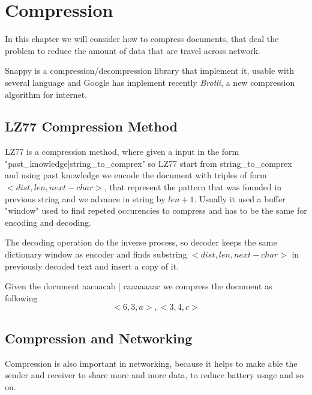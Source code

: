 \chapter{Compression}
In this chapter we will consider how to compress documents, that deal the problem to reduce 
the amount of data that are travel across network.

Snappy is a compression/decompression library that implement it, usable with several language and 
Google has implement recently \emph{Brotli}, a new compression algorithm for internet.

\section{LZ77 Compression Method}
LZ77 is a compression method, where given a input in the form "past\_knowledge|string\_to\_comprex"
so LZ77 start from string\_to\_comprex and using past knowledge we encode the document with triples
of form $<dist, len, next-char>$, that represent the pattern that was founded in previous string and
we advance in string by $len + 1$.\newline
Usually it used a buffer "window" used to find repeted occurencies to compress and has to be 
the same for encoding and decoding.

The decoding operation do the inverse process, so decoder keeps the same dictionary window as
encoder and finds substring $<dist, len, next-char>$ in previously decoded text and 
insert a copy of it.

\begin{esempio}
	Given the document aacaacab | caaaaaaac we compress the document as following
	\[ <6, 3, a>, <3, 4, c> \]
\end{esempio}

\section{Compression and Networking}
Compression is also important in networking, because it helps to make able the sender and receiver
to share more and more data, to reduce battery usage and so on.

